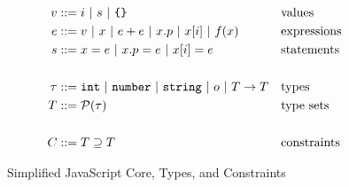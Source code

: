 \begin{figure}
\begin{align*}
v & ::= i\ |\ s\ |\ \text{\code{\{\}}} && \text{values}\\
e & ::= v\ |\ x\ |\ e + e\ |\ x.p\ |\ x[i]\ |\ f(x) && \text{expressions}\\
s & ::= x = e\ |\ x.p = e\ |\ x[i] = e && \text{statements}\\
\\
\tau & ::= \code{int}\ |\ \code{number}\ |\ \code{string}\ |\ o\ |\ T \rightarrow T && \text{types}\\
T & ::= \mathcal{P}(\tau) && \text{type sets}\\
\\
C & ::= T \supseteq T\ && \text{constraints}
\end{align*}
\caption{Simplified JavaScript Core, Types, and Constraints}
\label{fig:js-core}
\end{figure}

